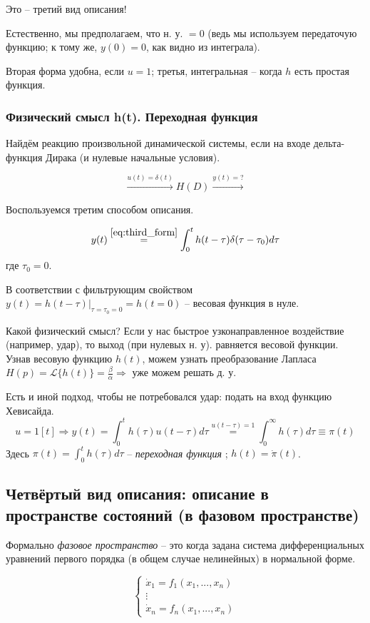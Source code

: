 \documentclass[main.tex]{subfiles}
\begin{document}
Это -- третий вид описания!

Естественно, мы предполагаем, что н. у. $ =0 $ (ведь мы используем передаточую функцию; к тому же, $ y(0) = 0 $, как видно из интеграла).

Вторая форма удобна, если $ u = 1 $; третья, интегральная -- когда $ h $ есть простая функция.

\subsubsection{Физический смысл h(t). Переходная функция}

Найдём реакцию произвольной динамической системы, если на входе дельта-функция Дирака (и нулевые начальные условия).

\[ \xrightarrow{u(t)=\delta(t)}\boxed{H(D)}\xrightarrow{y(t) = ?} \]

Воспользуемся третим способом описания.

$$ y(t) \overset{\eqref{eq:third_form}}= \int_0^t h(t-\tau)\delta(\tau-\tau_0) d\tau  $$
где $ \tau_0 = 0 $.

В соответствии с фильтрующим свойством $ y(t) = h(t-\tau)|_{\tau=\tau_0=0}=h(t=0) $ -- весовая функция в нуле.

Какой физический смысл?
Если у нас быстрое узконаправленное воздействие (например, удар), то выход (при нулевых н. у). равняется весовой функции.
Узнав весовую функцию $ h(t) $, можем узнать преобразование Лапласа $ H(p) = \mathcal{L}\{h(t)\} = \frac{\beta}{\alpha} \Rightarrow $ уже можем решать д. у.

Есть и иной подход, чтобы не потребовался удар: подать на вход функцию Хевисайда.
$$ u = 1[t] \Rightarrow y(t) = \int_{0}^{t}  h(\tau) u(t-\tau) d\tau \overset{u(t-\tau)=1}= \int_{0}^{\infty} h(\tau) d\tau \equiv \pi(t) $$
Здесь $\pi(t) = \int_0^t h(\tau)d\tau $ -- \emph{ переходная функция }; $ h(t) = \dot \pi(t) $.

\subsection{Четвёртый вид описания: описание в пространстве состояний (в фазовом пространстве)}

Формально \emph{фазовое пространство} -- это когда задана система дифференциальных уравнений первого порядка (в общем случае нелинейных) в нормальной форме.

\[ \begin{cases}
    \dot x_1 = f_1(x_1, ..., x_n) \\
    \vdots \\
    \dot x_n = f_n(x_1, ..., x_n)
\end{cases} \]
\end{document}
